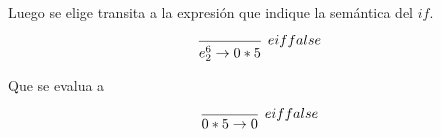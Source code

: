 \documentclass{article}
\begin{document}
\begin{enumerate}
{\begin{enumerate}
{				Luego se elige transita a la expresión que indique la semántica
				del $if$.

				\[
					\begin{prooftree}
						\infer 0 [$eiffalse$] {
							e_2^6
							\rightarrow
							0*5
						}
					\end{prooftree}
				\]

				Que se evalua a

				\[
					\begin{prooftree}
						\infer 0 [$eiffalse$] {
							0*5
							\rightarrow
							0
						}
					\end{prooftree}
				\]

            	}
            \end{enumerate}
        }
    \end{enumerate}
\end{document}

